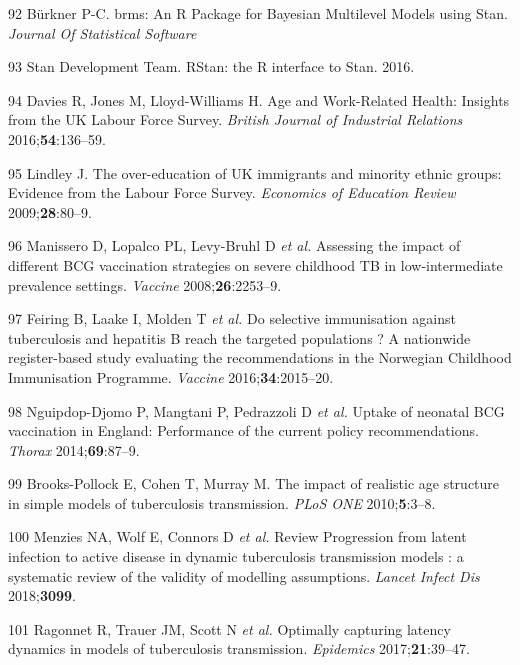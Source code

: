 \documentclass[11pt,twoside]{bristolthesis}
\begin{document}
  \leavevmode\hypertarget{ref-Burkner}{}%
  92 Bürkner P-C. brms: An R Package for Bayesian Multilevel Models using Stan. \emph{Journal Of Statistical Software}
  
  \leavevmode\hypertarget{ref-StanDevelopmentTeam2016}{}%
  93 Stan Development Team. RStan: the R interface to Stan. 2016.
  
  \leavevmode\hypertarget{ref-Davies2016a}{}%
  94 Davies R, Jones M, Lloyd-Williams H. Age and Work-Related Health: Insights from the UK Labour Force Survey. \emph{British Journal of Industrial Relations} 2016;\textbf{54}:136--59.
  
  \leavevmode\hypertarget{ref-Lindley2009}{}%
  95 Lindley J. The over-education of UK immigrants and minority ethnic groups: Evidence from the Labour Force Survey. \emph{Economics of Education Review} 2009;\textbf{28}:80--9.
  
  \leavevmode\hypertarget{ref-Manissero2008}{}%
  96 Manissero D, Lopalco PL, Levy-Bruhl D \emph{et al.} Assessing the impact of different BCG vaccination strategies on severe childhood TB in low-intermediate prevalence settings. \emph{Vaccine} 2008;\textbf{26}:2253--9.
  
  \leavevmode\hypertarget{ref-Feiring2016}{}%
  97 Feiring B, Laake I, Molden T \emph{et al.} Do selective immunisation against tuberculosis and hepatitis B reach the targeted populations ? A nationwide register-based study evaluating the recommendations in the Norwegian Childhood Immunisation Programme. \emph{Vaccine} 2016;\textbf{34}:2015--20.
  
  \leavevmode\hypertarget{ref-Nguipdop-Djomo2014}{}%
  98 Nguipdop-Djomo P, Mangtani P, Pedrazzoli D \emph{et al.} Uptake of neonatal BCG vaccination in England: Performance of the current policy recommendations. \emph{Thorax} 2014;\textbf{69}:87--9.
  
  \leavevmode\hypertarget{ref-Brooks-Pollock2010a}{}%
  99 Brooks-Pollock E, Cohen T, Murray M. The impact of realistic age structure in simple models of tuberculosis transmission. \emph{PLoS ONE} 2010;\textbf{5}:3--8.
  
  \leavevmode\hypertarget{ref-Menzies2018}{}%
  100 Menzies NA, Wolf E, Connors D \emph{et al.} Review Progression from latent infection to active disease in dynamic tuberculosis transmission models : a systematic review of the validity of modelling assumptions. \emph{Lancet Infect Dis} 2018;\textbf{3099}.
  
  \leavevmode\hypertarget{ref-Ragonnet2017}{}%
  101 Ragonnet R, Trauer JM, Scott N \emph{et al.} Optimally capturing latency dynamics in models of tuberculosis transmission. \emph{Epidemics} 2017;\textbf{21}:39--47.
  
\end{document}
